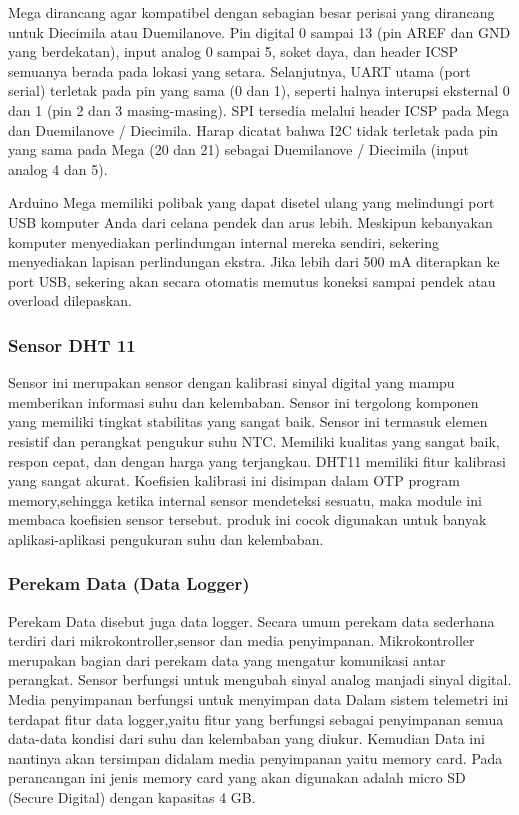 Mega dirancang agar kompatibel dengan sebagian besar perisai yang dirancang untuk Diecimila atau Duemilanove. Pin digital 0 sampai 13 (pin AREF dan GND yang berdekatan), input analog 0 sampai 5, soket daya, dan header ICSP semuanya berada pada lokasi yang setara. Selanjutnya, UART utama (port serial) terletak pada pin yang sama (0 dan 1), seperti halnya interupsi eksternal 0 dan 1 (pin 2 dan 3 masing-masing). SPI tersedia melalui header ICSP pada Mega dan Duemilanove / Diecimila. Harap dicatat bahwa I2C tidak terletak pada pin yang sama pada Mega (20 dan 21) sebagai Duemilanove / Diecimila (input analog 4 dan 5).

Arduino Mega memiliki polibak yang dapat disetel ulang yang melindungi port USB komputer Anda dari celana pendek dan arus lebih. Meskipun kebanyakan komputer menyediakan perlindungan internal mereka sendiri, sekering menyediakan lapisan perlindungan ekstra. Jika lebih dari 500 mA diterapkan ke port USB, sekering akan secara otomatis memutus koneksi sampai pendek atau overload dilepaskan.
\subsubsection{Sensor DHT 11}
Sensor ini merupakan sensor dengan kalibrasi sinyal digital yang mampu memberikan informasi suhu dan kelembaban. Sensor ini tergolong komponen yang memiliki tingkat stabilitas yang sangat baik. Sensor ini termasuk elemen resistif dan perangkat pengukur suhu NTC.
Memiliki kualitas yang sangat baik, respon cepat, dan dengan harga yang
terjangkau. DHT11 memiliki fitur kalibrasi yang sangat akurat. Koefisien kalibrasi ini disimpan dalam OTP program memory,sehingga ketika internal sensor mendeteksi sesuatu, maka module ini membaca koefisien sensor tersebut. produk ini cocok digunakan untuk banyak aplikasi-aplikasi pengukuran suhu dan kelembaban.

\subsubsection{Perekam Data (Data Logger)}
 Perekam Data disebut juga data logger. Secara umum perekam data sederhana terdiri dari mikrokontroller,sensor dan media penyimpanan.
Mikrokontroller merupakan bagian dari perekam data yang mengatur komunikasi antar perangkat. Sensor berfungsi untuk mengubah sinyal analog manjadi sinyal digital. Media penyimpanan berfungsi untuk menyimpan data Dalam sistem telemetri ini terdapat fitur data logger,yaitu fitur yang berfungsi sebagai penyimpanan semua data-data kondisi dari suhu dan kelembaban yang diukur. Kemudian Data ini nantinya akan
tersimpan didalam media penyimpanan yaitu memory card. Pada perancangan ini jenis memory card yang akan digunakan adalah micro SD 
(Secure Digital) dengan kapasitas 4 GB.

